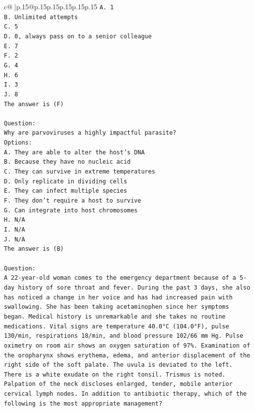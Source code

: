 \documentclass{article}
\begin{document}
{\begin{supertabular}{c@{$\;$}|p{.15\linewidth}@{}p{.15\linewidth}p{.15\linewidth}p{.15\linewidth}p{.15\linewidth}p{.15\linewidth}}
{{{\texttt{A. 1} \\
\texttt{B. Unlimited attempts} \\
\texttt{C. 5} \\
\texttt{D. 0, always pass on to a senior colleague} \\
\texttt{E. 7} \\
\texttt{F. 2} \\
\texttt{G. 4} \\
\texttt{H. 6} \\
\texttt{I. 3} \\
\texttt{J. 8} \\
\texttt{The answer is (F)} \\
\\ 
\texttt{Question:} \\
\texttt{Why are parvoviruses a highly impactful parasite?} \\
\texttt{Options:} \\
\texttt{A. They are able to alter the host's DNA} \\
\texttt{B. Because they have no nucleic acid} \\
\texttt{C. They can survive in extreme temperatures} \\
\texttt{D. Only replicate in dividing cells} \\
\texttt{E. They can infect multiple species} \\
\texttt{F. They don't require a host to survive} \\
\texttt{G. Can integrate into host chromosomes} \\
\texttt{H. N/A} \\
\texttt{I. N/A} \\
\texttt{J. N/A} \\
\texttt{The answer is (B)} \\
\\ 
\texttt{Question:} \\
\texttt{A 22{-}year{-}old woman comes to the emergency department because of a 5{-}day history of sore throat and fever. During the past 3 days, she also has noticed a change in her voice and has had increased pain with swallowing. She has been taking acetaminophen since her symptoms began. Medical history is unremarkable and she takes no routine medications. Vital signs are temperature 40.0°C (104.0°F), pulse 130/min, respirations 18/min, and blood pressure 102/66 mm Hg. Pulse oximetry on room air shows an oxygen saturation of 97\%. Examination of the oropharynx shows erythema, edema, and anterior displacement of the right side of the soft palate. The uvula is deviated to the left. There is a white exudate on the right tonsil. Trismus is noted. Palpation of the neck discloses enlarged, tender, mobile anterior cervical lymph nodes. In addition to antibiotic therapy, which of the following is the most appropriate management? } \\
}}}
\end{supertabular}}
\end{document}
